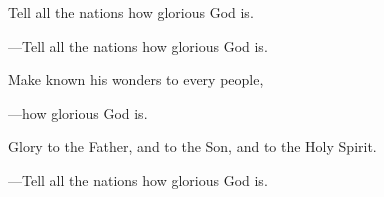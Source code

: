 \responsory

\begin{hangpar}
Tell all the nations how glorious God is.

{\color{red}---\thinspace}Tell all the nations how glorious God is.

\medskip Make known his wonders to every people,

{\color{red}---\thinspace}how glorious God is.

\medskip Glory to the Father, and to the Son, and to the Holy Spirit.

{\color{red}---\thinspace}Tell all the nations how glorious God is.
\end{hangpar}
